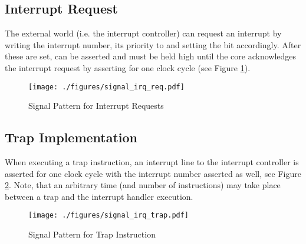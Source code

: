 \subsection{Interrupt Request}
The external world (i.e. the interrupt controller) can request an interrupt by writing the interrupt number, its priority to  and setting the  bit accordingly.
After these are set,  can be asserted and must be held high until the core acknowledges the interrupt request by asserting  for one clock cycle (see Figure \ref{fig:signal_irq_req}).

\begin{figure}[htb]
	\center
	\texttt{[image: ./figures/signal\_irq\_req.pdf]}
	\caption{Signal Pattern for Interrupt Requests}
	\label{fig:signal_irq_req}
\end{figure}

\subsection{Trap Implementation}
\label{sec:trap}
When executing a trap instruction, an interrupt line to the interrupt controller is asserted for one clock cycle with the interrupt number asserted as well, see Figure \ref{fig:signal_irq_trap}.
Note, that an arbitrary time (and number of instructions) may take place between a trap and the interrupt handler execution.
\begin{figure}[htb]
	\centering
	\texttt{[image: ./figures/signal\_irq\_trap.pdf]}
	\caption{Signal Pattern for Trap Instruction}
	\label{fig:signal_irq_trap}
\end{figure}
